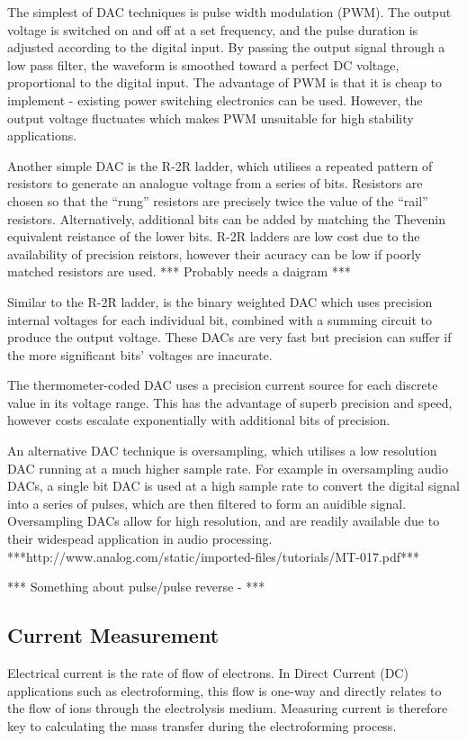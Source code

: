 The simplest of DAC techniques is pulse width modulation (PWM). The output voltage is switched on and off at a set frequency, and the pulse duration is adjusted according to the digital input. By passing the output signal through a low pass filter, the waveform is smoothed toward a perfect DC voltage, proportional to the digital input. The advantage of PWM is that it is cheap to implement - existing power switching electronics can be used. However, the output voltage fluctuates which makes PWM unsuitable for high stability applications.

Another simple DAC is the R-2R ladder, which utilises a repeated pattern of resistors to generate an analogue voltage from a series of bits. Resistors are chosen so that the ``rung'' resistors are precisely twice the value of the ``rail'' resistors. Alternatively, additional bits can be added by matching the Thevenin equivalent reistance of the lower bits. R-2R ladders are low cost due to the availability of precision reistors, however their acuracy can be low if poorly matched resistors are used. *** Probably needs a daigram ***

Similar to the R-2R ladder, is the binary weighted DAC which uses precision internal voltages for each individual bit, combined with a summing circuit to produce the output voltage. These DACs are very fast but precision can suffer if the more significant bits' voltages are inacurate.


The thermometer-coded DAC uses a precision current source for each discrete value in its voltage range. This has the advantage of superb precision and speed, however costs escalate exponentially with additional bits of precision.

An alternative DAC technique is oversampling, which utilises a low resolution DAC running at a much higher sample rate. For example in oversampling audio DACs, a single bit DAC is used at a high sample rate to convert the digital signal into a series of pulses, which are then filtered to form an auidible signal. Oversampling DACs allow for high resolution, and are readily available due to their widespead application in audio processing.
***http://www.analog.com/static/imported-files/tutorials/MT-017.pdf***

*** Something about pulse/pulse reverse - \cite{Chandrasekar} ***


\subsection{Current Measurement}
Electrical current is the rate of flow of electrons. In Direct Current (DC) applications such as electroforming, this flow is one-way and directly relates to the flow of ions through the electrolysis medium. Measuring current is therefore key to calculating the mass transfer during the electroforming process.


